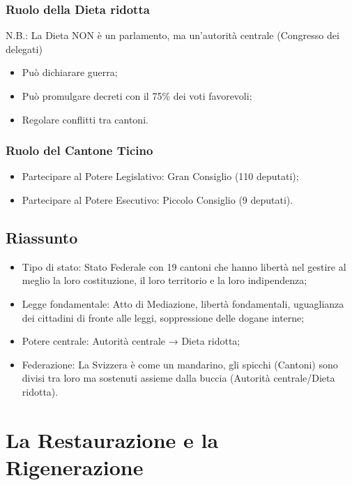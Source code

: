 \documentclass{article}
\begin{document}
\subsubsection{Ruolo della Dieta ridotta}
N.B.: La Dieta NON è un parlamento, ma un’autorità centrale (Congresso dei delegati)
\begin{itemize}
    \item Può dichiarare guerra;
    \item Può promulgare decreti con il 75\% dei voti favorevoli;
    \item Regolare conflitti tra cantoni.
\end{itemize}

\subsubsection{Ruolo del Cantone Ticino}
\begin{itemize}
    \item Partecipare al Potere Legislativo: Gran Consiglio (110 deputati);
    \item Partecipare al Potere Esecutivo: Piccolo Consiglio (9 deputati).
\end{itemize}

\subsection{Riassunto}
\begin{itemize}
    \item Tipo di stato: Stato Federale con 19 cantoni che hanno libertà nel gestire al meglio
        la loro costituzione, il loro territorio e la loro indipendenza;
    \item Legge fondamentale: Atto di Mediazione, libertà fondamentali, uguaglianza dei
        cittadini di fronte alle leggi, soppressione delle dogane interne;
    \item Potere centrale: Autorità centrale → Dieta ridotta;
    \item Federazione: La Svizzera è come un mandarino, gli spicchi (Cantoni) sono divisi tra
        loro ma sostenuti assieme dalla buccia (Autorità centrale/Dieta ridotta).
\end{itemize}

\newpage
\section{La Restaurazione e la Rigenerazione}
\end{document}
